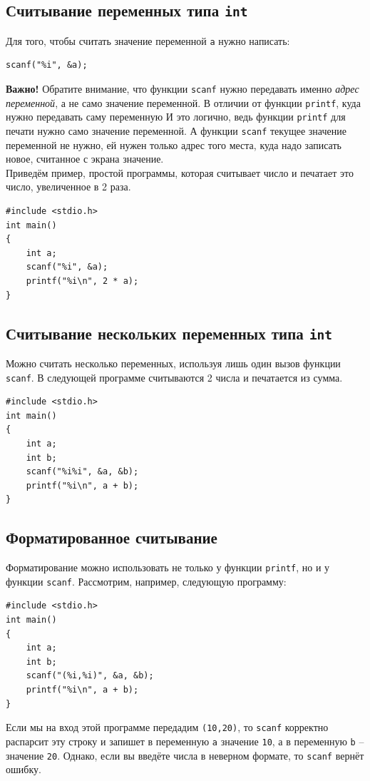 \documentclass{article}
\begin{document}
\subsection*{Считывание переменных типа \texttt{int}}
Для того, чтобы считать значение переменной \texttt{a} нужно написать:
\begin{lstlisting}
scanf("%i", &a);
\end{lstlisting}
\textbf{Важно!} Обратите внимание, что функции \texttt{scanf} нужно передавать именно \textit{адрес переменной}, а не само значение переменной. В отличии от функции \texttt{printf}, куда нужно передавать саму переменную
И это логично, ведь функции \texttt{printf} для печати нужно само значение переменной.
А функции \texttt{scanf} текущее значение переменной не нужно, ей нужен только адрес того места, куда надо записать новое, считанное с экрана значение.\\
\noindent Приведём пример, простой программы, которая считывает число и печатает это число, увеличенное в 2 раза.
\begin{lstlisting}
#include <stdio.h>
int main()
{
    int a;
    scanf("%i", &a);
    printf("%i\n", 2 * a);
}
\end{lstlisting}

\subsection*{Считывание нескольких переменных типа \texttt{int}}
Можно считать несколько переменных, используя лишь один вызов функции \texttt{scanf}. В следующей программе считываются 2 числа и печатается из сумма.
\begin{lstlisting}
#include <stdio.h>
int main()
{
    int a;
    int b;
    scanf("%i%i", &a, &b);
    printf("%i\n", a + b);
}
\end{lstlisting}

\subsection*{Форматированное считывание}
Форматирование можно использовать не только у функции \texttt{printf}, но и у функции \texttt{scanf}.
Рассмотрим, например, следующую программу:
\begin{lstlisting}
#include <stdio.h>
int main()
{
    int a;
    int b;
    scanf("(%i,%i)", &a, &b);
    printf("%i\n", a + b);
}
\end{lstlisting}
Если мы на вход этой программе передадим \texttt{(10,20)}, то \texttt{scanf} корректно распарсит эту строку и запишет в переменную \texttt{a} значение \texttt{10}, а в переменную \texttt{b} -- значение \texttt{20}. Однако, если вы введёте числа в неверном формате, то \texttt{scanf} вернёт ошибку.
\end{document}
